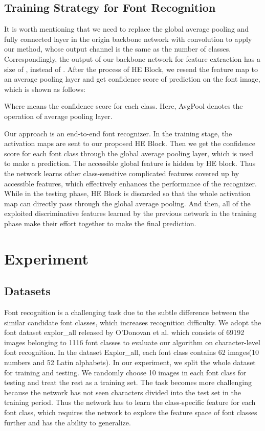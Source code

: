 \documentclass[manuscript,screen]{acmart}
\begin{document}
\subsection{Training Strategy for Font Recognition}
It is worth mentioning that we need to replace the global average pooling and fully connected layer in the origin backbone network with  convolution to apply our method, whose output channel is the same as the number of classes. Correspondingly, the output of our backbone network for feature extraction has a size of , instead of . After the process of HE Block, we resend the feature map to an average pooling layer and get confidence score of prediction on the font image, which is shown as follows:



Where  means the confidence score for each class. Here, AvgPool denotes the operation of average pooling layer.


Our approach is an end-to-end font recognizer. In the training stage, the activation maps are sent to our proposed HE Block. Then we get the confidence score for each font class through the global average pooling layer, which is used to make a prediction. The accessible global feature is hidden by HE block. Thus the network learns other class-sensitive complicated features covered up by accessible features, which effectively enhances the performance of the recognizer. While in the testing phase, HE Block is discarded so that the whole activation map can directly pass through the global average pooling. And then, all of the exploited discriminative features learned by the previous network in the training phase make their effort together to make the final prediction.

\section{Experiment}
\subsection{Datasets}
Font recognition is a challenging task due to the subtle difference between the similar candidate font classes, which increases recognition difficulty. We adopt the font dataset explor\_all released by O’Donovan et al. \cite{odonovan_exploratory_2014} which consists of 69192 images belonging to 1116 font classes to evaluate our algorithm on character-level font recognition. In the dataset Explor\_all, each font class contains 62 images(10 numbers and 52 Latin alphabets). In our experiment, we split the whole dataset for training and testing. We randomly choose 10 images in each font class for testing and treat the rest as a training set. The task becomes more challenging because the network has not seen characters divided into the test set in the training period. Thus the network has to learn the class-specific feature for each font class, which requires the network to explore the feature space of font classes further and has the ability to generalize.
\end{document}
